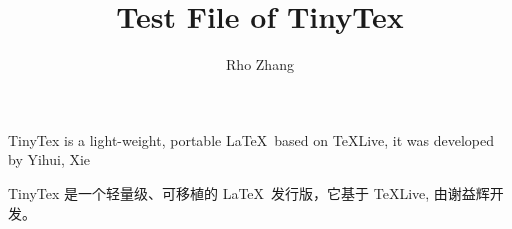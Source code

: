 \documentclass{ctexart}
\title{Test File of TinyTex}
\author{Rho Zhang}
\date{}
\begin{document}
TinyTex is a light-weight, portable \LaTeX \ based on TeXLive, 
it was developed by Yihui, Xie

TinyTex 是一个轻量级、可移植的 \LaTeX \ 发行版，它基于 TeXLive, 
由谢益辉开发。
\end{document}
